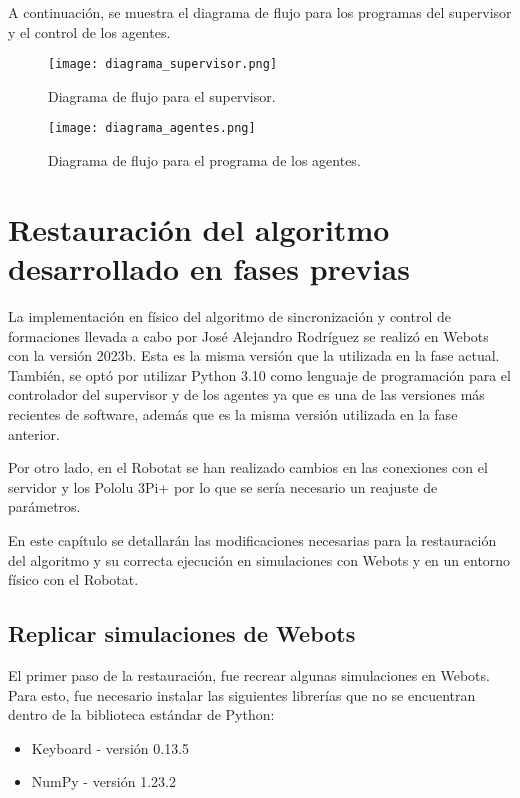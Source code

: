 A continuación, se muestra el diagrama de flujo para los programas del supervisor y el control de los agentes.

\begin{figure}[H]
	\centering
	\texttt{[image: diagrama\_supervisor.png]}
	\caption{Diagrama de flujo para el supervisor.}
	\label{fig:diagrama_supervisor}
\end{figure}

\begin{figure}[H]
	\centering
	\texttt{[image: diagrama\_agentes.png]}
	\caption{Diagrama de flujo para el programa de los agentes.}
	\label{fig:diagrama_agentes}
\end{figure}


\chapter{Restauración del algoritmo desarrollado en fases previas}
La implementación en físico del algoritmo de sincronización y control de formaciones llevada a cabo por José Alejandro Rodríguez \cite{RodriguezJA_2023_tesis} se realizó en Webots con la versión 2023b. Esta es la misma versión que la utilizada en la fase actual. También, se optó por utilizar Python 3.10 como lenguaje de programación para el controlador del supervisor y de los agentes ya que es una de las versiones más recientes de software, además que es la misma versión utilizada en la fase anterior. 

Por otro lado, en el Robotat se han realizado cambios en las conexiones con el servidor y los Pololu 3Pi+	por lo que se sería necesario un reajuste de parámetros.

En este capítulo se detallarán las modificaciones necesarias para la restauración del algoritmo y su correcta ejecución en simulaciones con Webots y en un entorno físico con el Robotat.


\section{Replicar simulaciones de Webots}

El primer paso de la restauración, fue recrear algunas simulaciones en Webots. Para esto, fue necesario instalar las siguientes librerías que no se encuentran dentro de la biblioteca estándar de Python:
\begin{itemize}
	\item Keyboard - versión 0.13.5
	\item NumPy - versión 1.23.2
\end{itemize}


